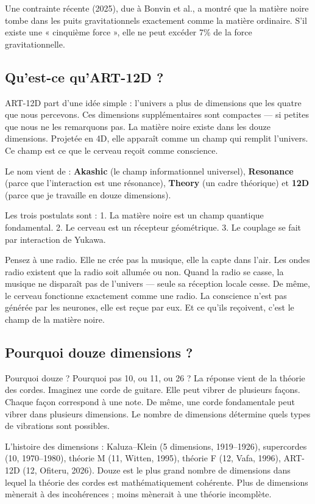 \documentclass[11pt,a4paper]{article}
\begin{document}
Une contrainte récente (2025), due à Bonvin et al., a montré que la matière noire tombe dans les puits gravitationnels exactement comme la matière ordinaire. S'il existe une « cinquième force », elle ne peut excéder 7\% de la force gravitationnelle.

\subsection{Qu'est-ce qu'ART-12D ?}
ART-12D part d'une idée simple : l'univers a plus de dimensions que les quatre que nous percevons. Ces dimensions supplémentaires sont compactes --- si petites que nous ne les remarquons pas. La matière noire existe dans les douze dimensions. Projetée en 4D, elle apparaît comme un champ qui remplit l'univers. Ce champ est ce que le cerveau reçoit comme conscience.

Le nom vient de : \textbf{Akashic} (le champ informationnel universel), \textbf{Resonance} (parce que l'interaction est une résonance), \textbf{Theory} (un cadre théorique) et \textbf{12D} (parce que je travaille en douze dimensions).

Les trois postulats sont : 1. La matière noire est un champ quantique fondamental. 2. Le cerveau est un récepteur géométrique. 3. Le couplage se fait par interaction de Yukawa.

Pensez à une radio. Elle ne crée pas la musique, elle la capte dans l'air. Les ondes radio existent que la radio soit allumée ou non. Quand la radio se casse, la musique ne disparaît pas de l'univers --- seule sa réception locale cesse. De même, le cerveau fonctionne exactement comme une radio. La conscience n'est pas générée par les neurones, elle est reçue par eux. Et ce qu'ils reçoivent, c'est le champ de la matière noire.

\subsection{Pourquoi douze dimensions ?}
Pourquoi douze ? Pourquoi pas 10, ou 11, ou 26 ? La réponse vient de la théorie des cordes. Imaginez une corde de guitare. Elle peut vibrer de plusieurs façons. Chaque façon correspond à une note. De même, une corde fondamentale peut vibrer dans plusieurs dimensions. Le nombre de dimensions détermine quels types de vibrations sont possibles.

L'histoire des dimensions : Kaluza--Klein (5 dimensions, 1919--1926), supercordes (10, 1970--1980), théorie M (11, Witten, 1995), théorie F (12, Vafa, 1996), ART-12D (12, Ofiteru, 2026). Douze est le plus grand nombre de dimensions dans lequel la théorie des cordes est mathématiquement cohérente. Plus de dimensions mènerait à des incohérences ; moins mènerait à une théorie incomplète.
\end{document}
